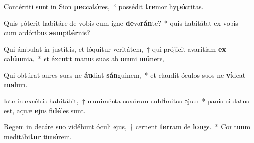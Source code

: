 \item Contérriti sunt in Sion \textbf{pec}ca\textbf{tó}res,~* possédit \textbf{tre}mor hy\textbf{pó}critas.
\item Quis póterit habitáre de vobis cum igne \textbf{de}vo\textbf{rán}te?~* quis habitábit ex vobis cum ardóribus \textbf{sem}pi\textbf{tér}nis?
\item Qui ámbulat in justítiis, et lóquitur veritátem,~† qui prójicit avarítiam \textbf{ex} ca\textbf{lúm}nia,~* et éxcutit manus suas ab \textbf{om}ni \textbf{mú}nere,
\item Qui obtúrat aures suas ne \textbf{áu}diat \textbf{sán}guinem,~* et claudit óculos suos ne \textbf{ví}deat \textbf{ma}lum.
\item Iste in excélsis habitábit,~† muniménta saxórum sub\textbf{lí}mitas \textbf{e}jus:~* panis ei datus est, aquæ \textbf{e}jus fi\textbf{dé}les sunt.
\item Regem in decóre suo vidébunt óculi ejus,~† cernent \textbf{ter}ram de \textbf{lon}ge.~* Cor tuum meditábi\textbf{tur} ti\textbf{mó}rem.
